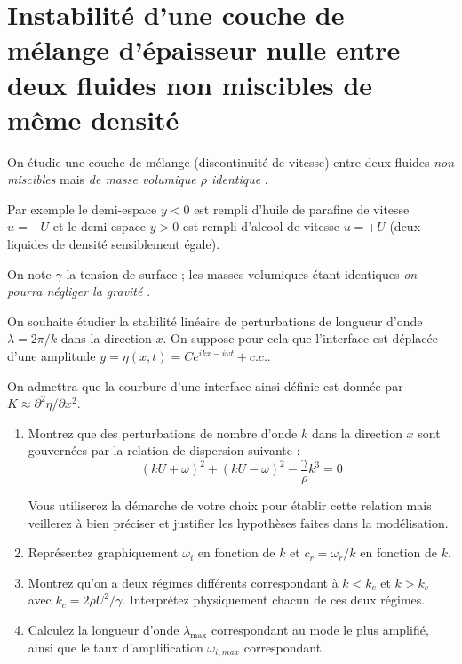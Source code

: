 \documentclass[a4paper,11pt]{article}
\begin{document}
\section{Instabilité d'une couche de mélange d'épaisseur nulle entre deux fluides non miscibles de même densité}


On étudie une couche de mélange (discontinuité de vitesse) entre deux fluides {\em non miscibles} 
mais {\em de masse volumique $\rho$ identique} .

Par exemple le demi-espace $y<0$ est rempli d'huile de parafine de vitesse $u =-U$ et le demi-espace $y>0$ est rempli d'alcool de vitesse
$ u = +U$ (deux liquides de densité sensiblement égale).

On note $\gamma$ la tension de surface ; les masses volumiques étant identiques {\em on pourra négliger la gravité }.

On souhaite étudier la stabilité linéaire de perturbations de longueur d'onde $\lambda = 2 \pi /k $ dans la direction $x$.
On suppose pour cela que l'interface est déplacée d'une amplitude $y = \eta(x,t) = C e^{i k x - i \omega t}+ c.c.$.

On admettra que la courbure d'une interface ainsi définie est donnée par $K \approx \partial^2 \eta/ \partial x^2$.
  



\begin{enumerate}

\item Montrez que des perturbations de nombre d'onde $k$ dans la direction $x$ sont gouvernées par la relation de dispersion suivante :
\begin{equation}
(k U + \omega)^2 + ( kU - \omega)^2 - \frac{\gamma}{\rho}  k^3 = 0
\end{equation} 

Vous utiliserez la démarche de votre choix pour établir cette relation mais veillerez à bien préciser et justifier les hypothèses faites dans la modélisation.

\item Représentez graphiquement $\omega_i$ en fonction de $k$ et $c_r = \omega_r/k$ en fonction de $k$.

\item Montrez qu'on a deux régimes différents correspondant à $k<k_c$ et $k>k_c$ avec $k_c = 2 \rho U^2 / \gamma$. 
Interprétez physiquement chacun de ces deux régimes.

\item Calculez la longueur d'onde $\lambda_{\max}$ correspondant au mode le plus amplifié, ainsi que le taux d'amplification $\omega_{i,max}$ correspondant.

\end{enumerate}
\end{document}

